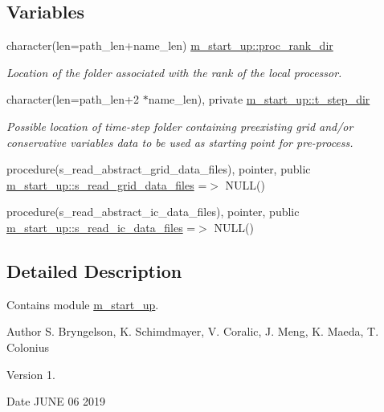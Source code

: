 \subsection*{Variables}
\begin{DoxyCompactItemize}
\item 
character(len=path\+\_\+len+name\+\_\+len) \hyperlink{namespacem__start__up_a15a1dec84d62ebf0216c78f9cbdd3d73}{m\+\_\+start\+\_\+up\+::proc\+\_\+rank\+\_\+dir}
\begin{DoxyCompactList}\small\item\em Location of the folder associated with the rank of the local processor. \end{DoxyCompactList}\item 
character(len=path\+\_\+len+2 $\ast$name\+\_\+len), private \hyperlink{namespacem__start__up_aa4d95a815bb7fb67f4717f93e906e605}{m\+\_\+start\+\_\+up\+::t\+\_\+step\+\_\+dir}
\begin{DoxyCompactList}\small\item\em Possible location of time-\/step folder containing preexisting grid and/or conservative variables data to be used as starting point for pre-\/process. \end{DoxyCompactList}\item 
procedure(s\+\_\+read\+\_\+abstract\+\_\+grid\+\_\+data\+\_\+files), pointer, public \hyperlink{namespacem__start__up_af646e0769cd88c45b2acfc47a3b15d7b}{m\+\_\+start\+\_\+up\+::s\+\_\+read\+\_\+grid\+\_\+data\+\_\+files} =$>$ N\+U\+LL()
\item 
procedure(s\+\_\+read\+\_\+abstract\+\_\+ic\+\_\+data\+\_\+files), pointer, public \hyperlink{namespacem__start__up_a7a35339ce3c84eaf721a80e77be63c07}{m\+\_\+start\+\_\+up\+::s\+\_\+read\+\_\+ic\+\_\+data\+\_\+files} =$>$ N\+U\+LL()
\end{DoxyCompactItemize}


\subsection{Detailed Description}
Contains module \hyperlink{namespacem__start__up}{m\+\_\+start\+\_\+up}. 

\begin{DoxyAuthor}{Author}
S. Bryngelson, K. Schimdmayer, V. Coralic, J. Meng, K. Maeda, T. Colonius 
\end{DoxyAuthor}
\begin{DoxyVersion}{Version}
1. 
\end{DoxyVersion}
\begin{DoxyDate}{Date}
J\+U\+NE 06 2019 
\end{DoxyDate}
